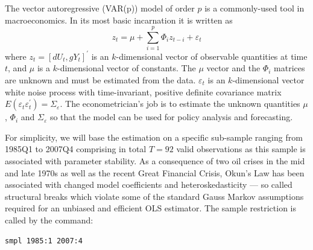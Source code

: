 \documentclass[11pt]{article}
\begin{document}
The vector autoregressive (VAR(p)) model of order $ p $ is a commonly-used tool in macroeconomics. In its most
basic incarnation it is written as
\begin{equation}
\label{eq:VAR}
	z_t = \mu + \sum_{i=1}^p \Phi_i z_{t-i} + \varepsilon_t
\end{equation}
where $z_t=\left[dU_t, gY_t\right]^\prime$ is an $k$-dimensional vector of observable quantities at time $t$, and $ \mu $ is a $k$-dimensional vector of constants. The $\mu$ vector and the $\Phi_i$ matrices are unknown and	must be estimated from the data. $\varepsilon_t$ is an $k$-dimensional vector white noise process with time-invariant, positive definite covariance matrix $ E(\varepsilon_t \varepsilon^\prime_t)=\Sigma_\varepsilon $. The econometrician's job is to estimate the unknown quantities $\mu$, $\Phi_i$ and $ \Sigma_\varepsilon $ so that the model can be used for policy analysis and forecasting.


%

For simplicity, we will base the estimation on a specific sub-sample ranging from 1985Q1 to 2007Q4 comprising in total $ T=92 $ valid observations as this sample is associated with parameter stability. As a consequence of two oil crises in the mid and late 1970s as well as the recent Great Financial Crisis, Okun's Law has been associated with changed model coefficients and heteroskedasticity --- so called structural breaks which violate some of the standard Gauss Markov assumptions required for an unbiased and efficient OLS estimator. The sample restriction is called by the command:
\begin{Verbatim}[baselinestretch=0.75, fontsize=\small]
smpl 1985:1 2007:4
\end{Verbatim}
\end{document}
